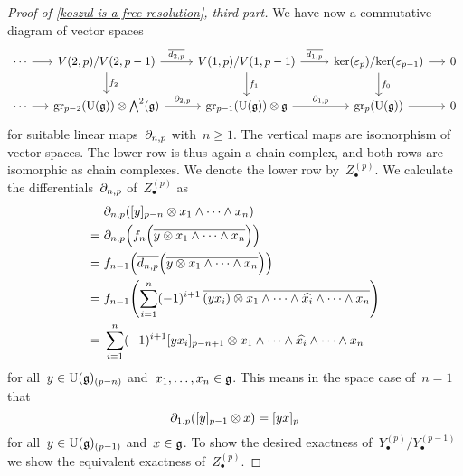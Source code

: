 \begin{proof}[Proof of \cref{koszul is a free resolution}, third part]
	We have now a commutative diagram of vector spaces
	\[
		\begin{tikzcd}
			\dotsb
			\arrow{r}
			&[-1em]
			V(2,p) / V(2, p-1)
			\arrow{r}[above]{\induced{d_{2,p}}}
			\arrow{d}[right]{f_2}
			&
			V(1,p) / V(1, p-1)
			\arrow{r}[above]{\induced{d_{1,p}}}
			\arrow{d}[right]{f_1}
			&
			\ker(\varepsilon_p) / {\ker(\varepsilon_{p-1})}
			\arrow{r}
			\arrow{d}[right]{f_0}
			&[-1em]
			0
			\\
			\dotsb
			\arrow{r}
			&
			\gr[p-2]( \Univ(\glie) ) \otimes \Exterior^2(\glie)
			\arrow{r}[above]{\del_{2,p}}
			&
			\gr[p-1]( \Univ(\glie) ) \otimes \glie
			\arrow{r}[above]{\del_{1,p}}
			&
			\gr[p]( \Univ(\glie) )
			\arrow{r}
			&
			0
		\end{tikzcd}
	\]
	for suitable linear maps~$\partial_{n,p}$ with~$n \geq 1$.
	The vertical maps are isomorphism of vector spaces.
	The lower row is thus again a chain complex, and both rows are isomorphic as chain complexes.
	We denote the lower row by~$Z^{(p)}_\bullet$.
	We calculate the differentials~$\partial_{n,p}$ of~$Z^{(p)}_\bullet$ as
	\begin{align*}
		{}&
		\partial_{n,p}( \lbrack y \rbrack_{p-n} \otimes x_1 \wedge \dotsb \wedge x_n )
		\\
		={}&
		\partial_{n,p}\Bigl( f_n\Bigl( \overline{ y \otimes x_1 \wedge \dotsb \wedge x_n } \Bigr) \Bigr) 
		\\
		={}&
		f_{n-1}\Bigl( \overline{d_{n,p}}\Bigl( \overline{ y \otimes x_1 \wedge \dotsb \wedge x_n } \Bigr) \Bigr)
		\\
		={}&
		f_{n-1}
		\Biggl(
			\sum_{i=1}^n
			(-1)^{i+1}
			\,
			\overline{ (y x_i) \otimes x_1 \wedge \dotsb \wedge \widehat{x_i} \wedge \dotsb \wedge x_n }
		\Biggr)
		\\
		={}&
		\sum_{i=1}^n
		(-1)^{i+1}
		\lbrack y x_i \rbrack_{p-n+1} \otimes x_1 \wedge \dotsb \wedge \widehat{x_i} \wedge \dotsb \wedge x_n
	\end{align*}
	for all~$y \in \operatorname{U}(\mathfrak{g})_{(p-n)}$ and~$x_1, \dotsc, x_n \in \mathfrak{g}$.
	This means in the space case of~$n = 1$ that
	\[
		\partial_{1,p}( \lbrack y \rbrack_{p-1} \otimes x )
		=
		\lbrack yx \rbrack_p
	\]
	for all~$y \in \operatorname{U}(\mathfrak{g})_{(p-1)}$ and~$x \in \mathfrak{g}$.
	To show the desired exactness of~$Y^{(p)}_\bullet / Y^{(p-1)}_\bullet$ we show the equivalent exactness of~$Z^{(p)}_\bullet$.


\end{proof}
